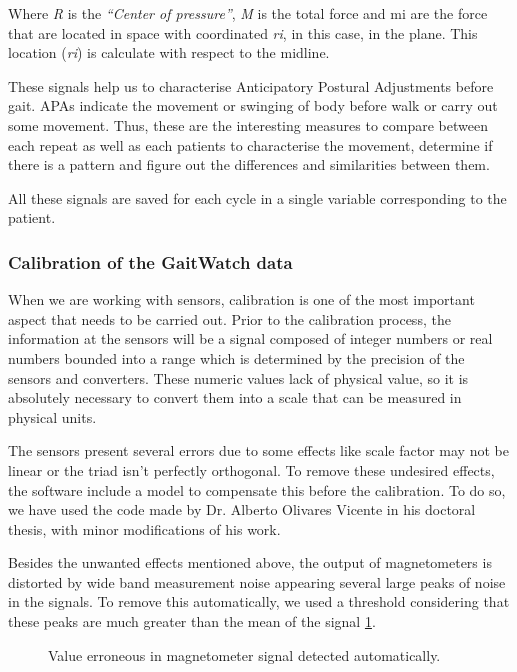 Where \textit{R} is the \textit{“Center of pressure”\textit{}}, \textit{M\textit{}} is the total force and mi are the force that are located in space with coordinated \textit{ri\textit{}}, in this case, in the plane. This location (\textit{ri}) is calculate with respect to the midline.

These signals help us to characterise Anticipatory Postural Adjustments  before gait.  APAs indicate the movement or swinging of body before walk or carry out some movement. Thus, these are the interesting  measures to compare between each repeat as well as each patients to characterise the movement, determine if there is a pattern and figure out the differences and similarities between them.

All these signals are saved for each cycle in a single variable corresponding to the patient.


\subsubsection{Calibration of the GaitWatch data}
When we are working with sensors, calibration is one of the most important aspect that needs to be carried out. Prior to the calibration process,
the information at the sensors  will be a signal composed of integer
numbers  or real numbers bounded into a range which is determined by the precision of the sensors and converters. These numeric values lack of physical value, so it is absolutely necessary to convert them into a scale that can be measured in physical units.

The sensors present several errors due to some effects like scale factor may not be linear or the triad isn’t perfectly orthogonal. To remove these undesired effects, the software include a model to compensate this before the calibration. 
To do so, we have used the code made by Dr. Alberto Olivares Vicente in his doctoral thesis\cite{A.Olivares2013}, with minor modifications of his work.

Besides the unwanted effects mentioned above, the output of magnetometers is distorted by wide band measurement noise appearing several large peaks of noise in the signals. To remove this automatically, we used a threshold considering that these peaks are much greater than the mean of the signal \ref{fig:GWErrorDetected}.

\begin{figure}[H]
	\centering
	\caption{Value erroneous in magnetometer signal detected automatically.}
	\label{fig:GWErrorDetected}
	\end{figure}


